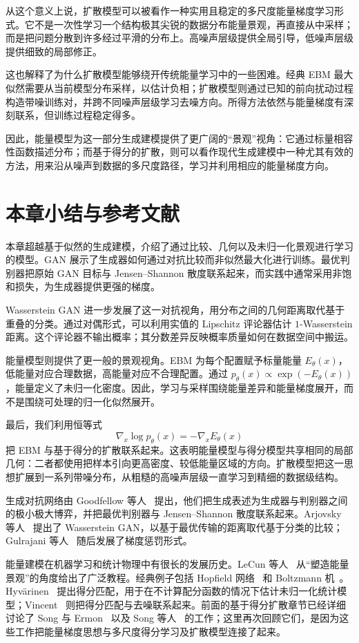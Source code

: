 从这个意义上说，扩散模型可以被看作一种实用且稳定的多尺度能量梯度学习形式。它不是一次性学习一个结构极其尖锐的数据分布能量景观，再直接从中采样；而是把问题分散到许多经过平滑的分布上。高噪声层级提供全局引导，低噪声层级提供细致的局部修正。

这也解释了为什么扩散模型能够绕开传统能量学习中的一些困难。经典 EBM 最大似然需要从当前模型分布采样，以估计负相；扩散模型则通过已知的前向扰动过程构造带噪训练对，并跨不同噪声层级学习去噪方向。所得方法依然与能量梯度有深刻联系，但训练过程稳定得多。

因此，能量模型为这一部分生成建模提供了更广阔的“景观”视角：它通过标量相容性函数描述分布；而基于得分的扩散，则可以看作现代生成建模中一种尤其有效的方法，用来沿从噪声到数据的多尺度路径，学习并利用相应的能量梯度方向。

\section*{本章小结与参考文献}

本章超越基于似然的生成建模，介绍了通过比较、几何以及未归一化景观进行学习的模型。GAN 展示了生成器如何通过对抗比较而非似然最大化进行训练。最优判别器把原始 GAN 目标与 Jensen--Shannon 散度联系起来，而实践中通常采用非饱和损失，为生成器提供更强的梯度。

Wasserstein GAN 进一步发展了这一对抗视角，用分布之间的几何距离取代基于重叠的分类。通过对偶形式，可以利用实值的 Lipschitz 评论器估计 $1$-Wasserstein 距离。这个评论器不输出概率；其分数差异反映概率质量如何在数据空间中搬运。

能量模型则提供了更一般的景观视角。EBM 为每个配置赋予标量能量 $E_\theta(x)$，低能量对应合理数据，高能量对应不合理配置。通过 $p_\theta(x)\propto \exp(-E_\theta(x))$，能量定义了未归一化密度。因此，学习与采样围绕能量差异和能量梯度展开，而不是围绕可处理的归一化似然展开。

最后，我们利用恒等式
\[
\nabla_x\log p_\theta(x)
=
-\nabla_xE_\theta(x)
\]
把 EBM 与基于得分的扩散联系起来。这表明能量模型与得分模型共享相同的局部几何：二者都使用把样本引向更高密度、较低能量区域的方向。扩散模型把这一思想扩展到一系列带噪分布，从粗糙的高噪声层级一直学习到精细的数据级结构。

\bigskip

生成对抗网络由 Goodfellow 等人~\cite{goodfellow2014generative} 提出，他们把生成表述为生成器与判别器之间的极小极大博弈，并把最优判别器与 Jensen--Shannon 散度联系起来。Arjovsky 等人~\cite{arjovsky2017wasserstein} 提出了 Wasserstein GAN，以基于最优传输的距离取代基于分类的比较；Gulrajani 等人~\cite{gulrajani2017improved} 随后发展了梯度惩罚形式。

能量建模在机器学习和统计物理中有很长的发展历史。LeCun 等人~\cite{lecun2006tutorial} 从“塑造能量景观”的角度给出了广泛教程。经典例子包括 Hopfield 网络~\cite{hopfield1982neural} 和 Boltzmann 机~\cite{hinton1985learning}。Hyv\"arinen~\cite{hyvarinen2005estimation} 提出得分匹配，用于在不计算配分函数的情况下估计未归一化统计模型；Vincent~\cite{vincent2011connection} 则把得分匹配与去噪联系起来。前面的基于得分扩散章节已经详细讨论了 Song 与 Ermon~\cite{song2019generative} 以及 Song 等人~\cite{song2021scorebased} 的工作；这里再次回顾它们，是因为这些工作把能量梯度思想与多尺度得分学习及扩散模型连接了起来。
